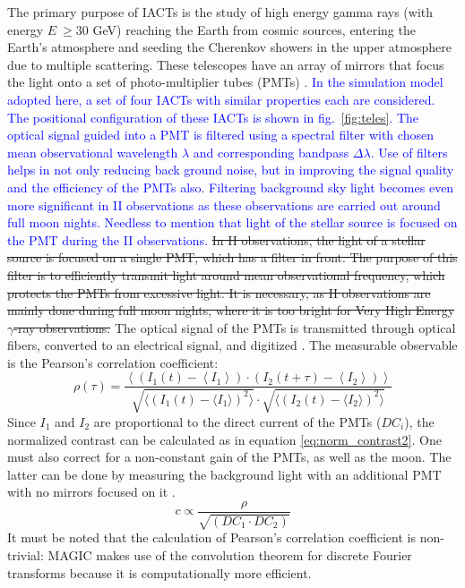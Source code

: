 The primary purpose of IACTs is the study of high energy gamma rays (with energy $E\ \geq 30$ GeV) reaching the Earth from cosmic sources, entering the Earth's atmosphere and seeding the Cherenkov showers in the upper atmosphere due to multiple scattering. These telescopes have an array of mirrors that focus the light onto a set of photo-multiplier tubes (PMTs) \cite{aleksic2016major}. 
\textcolor{blue}{In the simulation model adopted here, a set of four IACTs with similar properties each are considered. The positional configuration of these IACTs is shown in fig.~\ref{fig:teles}. The optical signal guided into a PMT is filtered using a spectral filter with chosen mean observational wavelength $\lambda$ and corresponding bandpass $\Delta \lambda$. 
Use of filters helps in not only reducing back ground noise, but in improving the signal quality and the efficiency of the PMTs also. Filtering background sky light becomes even more significant in II observations as these observations are carried out around full moon nights. Needless to mention that light of the stellar source is focused on the PMT during the II observations.} 
\st{In II observations, the light of a stellar source is focused on a single PMT, which has a filter in front. The purpose of this filter is to efficiently transmit light around mean observational frequency, which protects the PMTs from excessive light. It is necessary, as II observations are mainly done during full moon nights, where it is too bright for Very High Energy $\gamma$-ray observations.} The optical signal of the PMTs is transmitted through optical fibers, converted to an electrical signal, and digitized \cite{acciari2020optical}. The measurable observable is the Pearson's correlation coefficient:
\begin{equation}
	\rho(\tau) = \frac{\left\langle \left( I_1(t) - \left\langle I_1 \right\rangle \right) \cdot \left( I_2(t + \tau) - \left\langle I_2 \right\rangle \right) \right\rangle}{\sqrt{\langle \left( I_1(t) - \langle I_1 \rangle \right)^2 \rangle} \cdot \sqrt{\langle \left( I_2(t) - \langle I_2 \rangle \right) ^2 \rangle}}
	\label{eqn:pearson}
\end{equation}
Since $I_1$ and $I_2$ are proportional to the direct current of the PMTs ($DC_i$), the normalized contrast can be calculated as in equation \ref{eq:norm_contrast2}. One must also correct for a non-constant gain of the PMTs, as well as the moon. The latter can be done by measuring the background light with an additional PMT with no mirrors focused on it \cite{acciari2020optical}. 
\begin{equation}
	c \propto \frac{\rho}{\sqrt{\left(DC_1 \cdot DC_2 \right)}}
	\label{eq:norm_contrast2}
\end{equation}
It must be noted that the calculation of Pearson's correlation coefficient is non-trivial: MAGIC makes use of the convolution theorem for discrete Fourier transforms because it is computationally more efficient.

